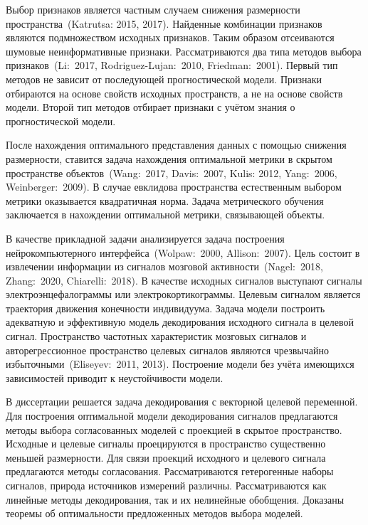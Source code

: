 \documentclass[11pt, a5paper]{dissert}
\begin{document}
Выбор признаков является частным случаем снижения размерности пространства~(Katrutsa: 2015, 2017). 
Найденные комбинации признаков являются подмножеством исходных признаков.
Таким образом отсеиваются шумовые неинформативные признаки.
Рассматриваются два типа методов выбора признаков~(Li:~2017, Rodriguez-Lujan:~2010, Friedman:~2001).
Первый тип методов не зависит от последующей прогностической модели.
Признаки отбираются на основе свойств исходных пространств, а не на основе свойств модели.
Второй тип методов отбирает признаки с учётом знания о прогностической модели. 

После нахождения оптимального представления данных с помощью снижения размерности, ставится задача нахождения оптимальной метрики в скрытом пространстве объектов~(Wang:~2017, Davis:~2007, Kulis: 2012, Yang:~2006, Weinberger:~2009).
В случае евклидова пространства естественным выбором метрики оказывается квадратичная норма.
Задача метрического обучения заключается в нахождении оптимальной метрики, связывающей объекты.

В качестве прикладной задачи анализируется задача построения нейрокомпьютерного интерфейса~(Wolpaw:~2000, Allison:~2007). 
Цель состоит в извлечении информации из сигналов мозговой активности~(Nagel:~2018, Zhang:~2020, Chiarelli:~2018). 
В качестве исходных сигналов выступают сигналы электроэнцефалограммы или электрокортикограммы. 
Целевым сигналом является траектория движения конечности индивидуума.
Задача модели построить адекватную и эффективную модель декодирования исходного сигнала в целевой сигнал.
Пространство частотных характеристик мозговых сигналов и авторегрессионное пространство целевых сигналов являются чрезвычайно избыточными~(Eliseyev:~2011, 2013). 
Построение модели без учёта имеющихся зависимостей приводит к неустойчивости модели.

В диссертации решается задача декодирования с векторной целевой переменной. 
Для построения оптимальной модели декодирования сигналов предлагаются методы выбора согласованных моделей с проекцией в скрытое пространство.
Исходные и целевые сигналы проецируются в пространство существенно меньшей размерности. 
Для связи проекций исходного и целевого сигнала предлагаются методы согласования.
Рассматриваются гетерогенные наборы сигналов, природа источников измерений различны.
Рассматриваются как линейные методы декодирования, так и их нелинейные обобщения.
Доказаны теоремы об оптимальности предложенных методов выбора моделей.
\end{document}

